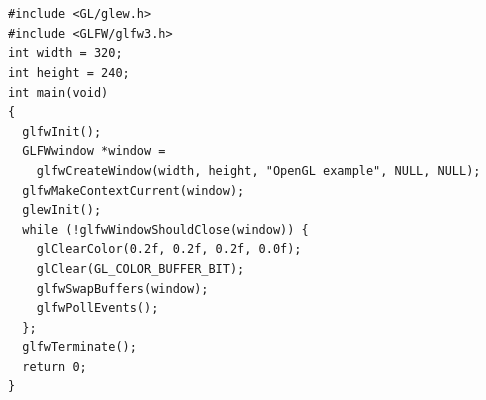 \documentclass[calcdimensions,landscape,letterpaper]{powersem}
\newcommand{\thecurrentheading}{}
\newcommand{\heading}[1]{\renewcommand{\thecurrentheading}{#1}}
\begin{document}
\begin{slide}
  \heading{GLEW}
  \begin{center}
    \\
  \end{center}
\end{slide}

\begin{slide}
  \heading{GLFW}
  \begin{center}
    \\
  \end{center}
\end{slide}

\begin{slide}
    \heading{GLFW Window}
    \begin{center}
        \begin{minipage}[c]{.98\textwidth}
            \begin{verbatim}
#include <GL/glew.h>
#include <GLFW/glfw3.h>
int width = 320;
int height = 240;
int main(void)
{
  glfwInit();
  GLFWwindow *window =
    glfwCreateWindow(width, height, "OpenGL example", NULL, NULL);
  glfwMakeContextCurrent(window);
  glewInit();
  while (!glfwWindowShouldClose(window)) {
    glClearColor(0.2f, 0.2f, 0.2f, 0.0f);
    glClear(GL_COLOR_BUFFER_BIT);
    glfwSwapBuffers(window);
    glfwPollEvents();
  };
  glfwTerminate();
  return 0;
}
            \end{verbatim}
        \end{minipage}
    \end{center}
\end{slide}
\end{document}
